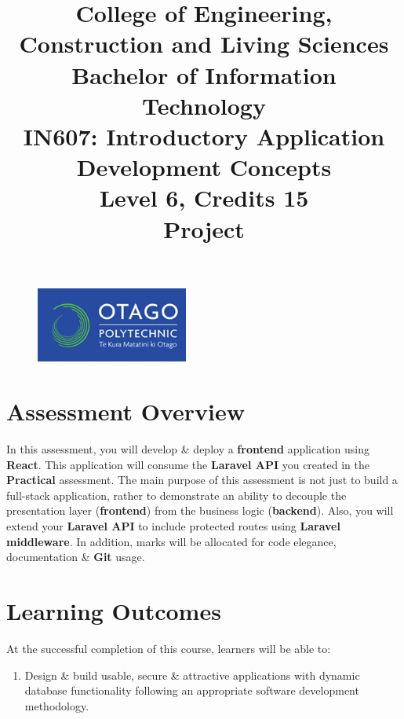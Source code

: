 \documentclass{article}
\author{}
\begin{document}
\begin{figure}
	\centering
	\includegraphics[width=50mm]{./img/logo.png}
\end{figure}

\title{College of Engineering, Construction and Living Sciences\\Bachelor of Information Technology\\IN607: Introductory Application Development Concepts\\Level 6, Credits 15\\\textbf{Project}}
\date{}
\maketitle

\section*{Assessment Overview}
In this assessment, you will develop \& deploy a \textbf{frontend} application using \textbf{React}. This application will consume the \textbf{Laravel API} you created in the \textbf{Practical} assessment. The main purpose of this assessment is not just to build a full-stack application, rather to demonstrate an ability to decouple the presentation layer (\textbf{frontend}) from the business logic (\textbf{backend}). Also, you will extend your \textbf{Laravel API} to include protected routes using \textbf{Laravel middleware}. In addition, marks will be allocated for code elegance, documentation \& \textbf{Git} usage.

\section*{Learning Outcomes}
At the successful completion of this course, learners will be able to:
\begin{enumerate}
	\item Design \& build usable, secure \& attractive applications with dynamic database functionality following an appropriate software development methodology.
\end{enumerate}
\end{document}
